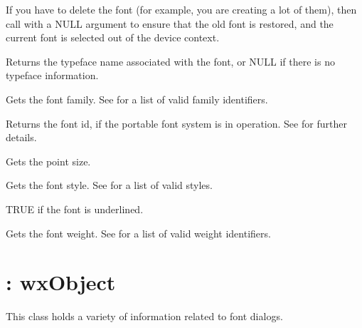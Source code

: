 If you have to delete the font (for example, you are creating a lot of
them), then call  with a NULL argument
to ensure that the old font is restored, and the current font is selected
out of the device context.



Returns the typeface name associated with the font, or NULL if there is no
typeface information.



Gets the font family. See  for a list of valid
family identifiers.



Returns the font id, if the portable font system is in operation. See  for
further details.



Gets the point size.



Gets the font style.  See  for a list of valid
styles.



TRUE if the font is underlined.



Gets the font weight. See  for a list of valid
weight identifiers.

\section{: wxObject}\label{wxfontdata}


This class holds a variety of information related to font dialogs.

